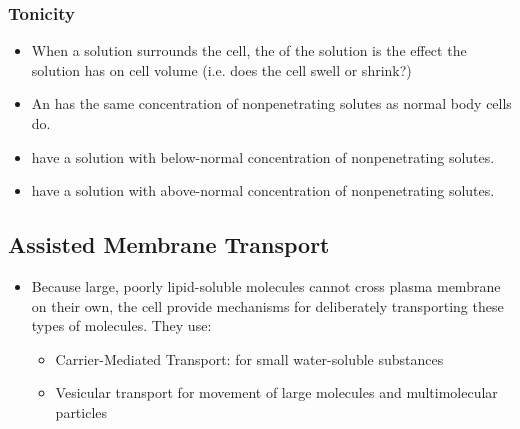 \documentclass{article}
\numberwithin{equation}{section}
\begin{document}
\subsubsection{Tonicity}
\begin{itemize}
    \item When a solution surrounds the cell, the  of the solution is the effect the solution has on cell volume (i.e. does the cell swell or shrink?)
    \item An  has the same concentration of nonpenetrating solutes as normal body cells do.
    \item {} have a solution with below-normal concentration of nonpenetrating solutes.
    \item {} have a solution with above-normal concentration of nonpenetrating solutes.
\end{itemize}
\subsection{Assisted Membrane Transport}
\begin{itemize}
    \item Because large, poorly lipid-soluble molecules cannot cross plasma membrane on their own, the cell provide mechanisms for deliberately transporting these types of molecules. They use:
    \begin{itemize}
        \item Carrier-Mediated Transport: for small water-soluble substances
        \item Vesicular transport for movement of large molecules and multimolecular particles
    \end{itemize}
\end{itemize}
\end{document}
